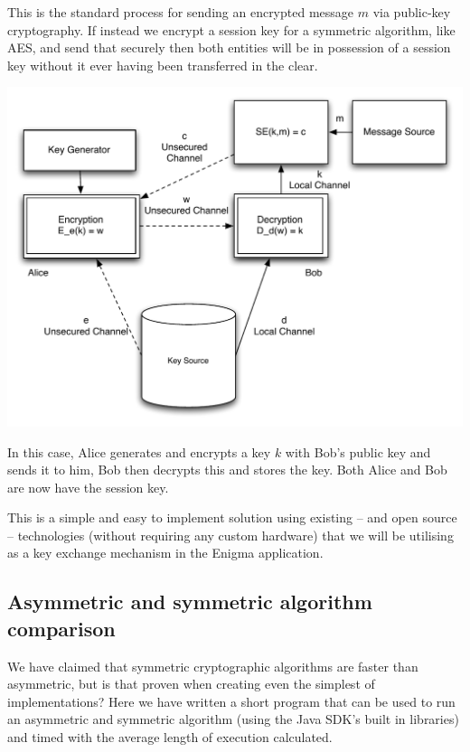 This is the standard process for sending an encrypted message $m$ via public-key cryptography. If instead we encrypt a session key for a symmetric algorithm, like AES, and send that securely then both entities will be in possession of a session key without it ever having been transferred in the clear.

\begin{center}
  \includegraphics[scale=0.6]{./Figures/3-7b.pdf}
\end{center}

In this case, Alice generates and encrypts a key $k$ with Bob's public key and sends it to him, Bob then decrypts this and stores the key. Both Alice and Bob are now have the session key.

This is a simple and easy to implement solution using existing -- and open source -- technologies (without requiring any custom hardware) that we will be utilising as a key exchange mechanism in the Enigma application.

\subsection{Asymmetric and symmetric algorithm comparison}

We have claimed that symmetric cryptographic algorithms are faster than asymmetric, but is that proven when creating even the simplest of implementations? Here we have written a short program that can be used to run an asymmetric and symmetric algorithm (using the Java SDK's built in libraries) and timed with the average length of execution calculated.

